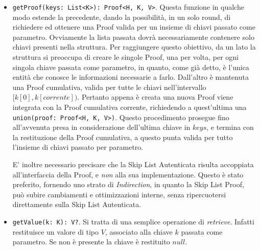\begin{itemize}
		\item \verb|getProof(keys: List<K>): Proof<H, K, V>|. Questa funzione in qualche modo estende la precedente, dando la possibilità, in un solo round, di richiedere ed ottenere una Proof valida per un insieme di chiavi passato come parametro. Ovviamente la lista passata dovrà necessariamente contenere solo chiavi presenti nella struttura.
		Per raggiungere questo obiettivo, da un lato la struttura si preoccupa di creare le singole Proof, una per volta, per ogni singola chiave passata come parametro, in quanto, come già detto, è l'unica entità che conosce le informazioni necessarie a farlo. Dall'altro è mantenuta una Proof cumulativa, valida per tutte le chiavi nell'intervallo $ [k[0], k[corrente]) $. Pertanto appena è creata una nuova Proof viene integrata con la Proof cumulativa corrente, richiedendo a quest'ultima una \verb|union(proof: Proof<H, K, V>)|. Questo procedimento prosegue fino all'avvenuta presa in considerazione dell'ultima chiave in $ keys $, e termina con la restituzione della Proof cumulativa, a questo punta valida per tutto l'insieme di chiavi passato per parametro.
		
		E' inoltre necessario precisare che la Skip List Autenticata risulta accoppiata all'interfaccia della Proof, e \textit{non} alla sua implementazione. Questo è stato preferito, fornendo uno strato di \textit{Indirection}, in quanto la Skip List Proof, può subire cambiamenti e ottimizzazioni interne, senza ripercuotersi direttamente sulla Skip List Autenticata.
		
		\item \verb|getValue(k: K): V?|. Si tratta di una semplice operazione di \textit{retrieve}. Infatti restituisce un valore di tipo $ V $, associato alla chiave $ k $ passata come parametro. Se non è presente la chiave è restituito $ null $.
		

\end{itemize}
